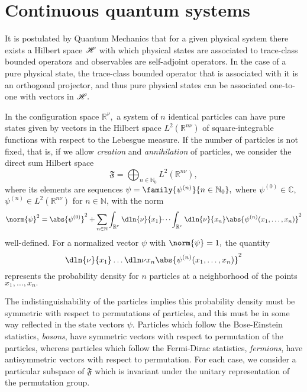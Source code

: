 \chapter{Continuous quantum systems}
It is postulated by Quantum Mechanics that for a given physical system there exists a Hilbert space \(\mathscr{H}\) with which physical states are associated to trace-class bounded operators and observables are self-adjoint operators. In the case of a pure physical state, the trace-class bounded operator that is associated with it is an orthogonal projector, and thus pure physical states can be associated one-to-one with vectors in \(\mathscr{H}.\) 

In the configuration space \(\mathbb{R}^\nu,\) a system of \(n\) identical particles can have pure states given by vectors in the Hilbert space \(L^2(\mathbb{R}^{n\nu})\) of square-integrable functions with respect to the Lebesgue measure. If the number of particles is not fixed, that is, if we allow \emph{creation} and \emph{annihilation} of particles, we consider the direct sum Hilbert space
\begin{equation*}
    \mathfrak{F} = \bigoplus_{n \in \mathbb{N}_0} L^2(\mathbb{R}^{n\nu}),
\end{equation*}
where its elements are sequences \(\psi = \family{\psi^{(n)}}{n \in \mathbb{N}_0},\) where \(\psi^{(0)} \in \mathbb{C},\) \(\psi^{(n)} \in L^2(\mathbb{R}^{n\nu})\) for \(n \in \mathbb{N}\), with the norm
\begin{equation*}
    \norm{\psi}^2 = \abs{\psi^{(0)}}^2 + \sum_{n \in \mathbb{N}} \int_{\mathbb{R}^{\nu}} \dln{\nu}{x_1} \dots \int_{\mathbb{R}^\nu} \dln{\nu}{x_{n}} \abs{\psi^{(n)}(x_1, \dots, x_n)}^2
\end{equation*}
well-defined. For a normalized vector \(\psi\) with \(\norm{\psi} = 1,\) the quantity 
\begin{equation*}
    \dln{\nu}{x_1} \dots \dln\nu{x_n}\abs{\psi^{(n)}(x_1, \dots, x_n)}^2
\end{equation*}
represents the probability density for \(n\) particles at a neighborhood of the points \(x_1, \dots, x_n.\) 

The indistinguishability of the particles implies this probability density must be symmetric with respect to permutations of particles, and this must be in some way reflected in the state vectors \(\psi.\) Particles which follow the Bose-Einstein statistics, \emph{bosons}, have symmetric vectors with respect to permutation of the particles, whereas particles which follow the Fermi-Dirac statistics, \emph{fermions}, have antisymmetric vectors with respect to permutation. For each case, we consider a particular subspace of \(\mathfrak{F}\) which is invariant under the unitary representation of the permutation group.

